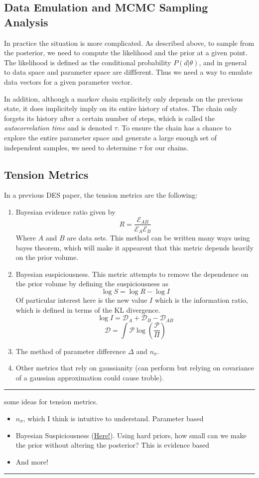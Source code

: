\subsection{Data Emulation and MCMC Sampling Analysis}

In practice the situation is more complicated. As described above, to sample from the posterior, we need to compute the likelihood and the prior at a given point. The likelihood is defined as the conditional probability $P(d|\theta)$, and in general to data space and parameter space are diffferent.
Thus we need a way to emulate data vectors for a given parameter vector.

In addition, although a markov chain explicitely only depends on the previous state, it does implicitely imply on its entire history of states. The chain only forgets its history after a certain number of steps, which is called the \textit{autocorrelation time} and is denoted $\tau$. To ensure the chain has a chance to explore the entire parameter space and generate a large enough set of independent samples, we need to determine $\tau$ for our chains.

\subsection{Tension Metrics}
In a previous DES paper, the tension metrics are the following:
\begin{enumerate}
    \item Bayesian evidence ratio given by
	\[ R = \frac{\mathcal{E}_{AB}}{\mathcal{E}_A\mathcal{E}_B} \]
	Where $A$ and $B$ are data sets. This method can be written many ways using bayes theorem, which will make it appearent that this metric depends heavily on the prior volume.
    \item Bayesian suspiciousness. This metric attempts to remove the dependence on the prior volume by defining the suspiciousness as 
	\[ \log S = \log R - \log I \]
	Of particular interest here is the new value $I$ which is the information ratio, which is defined in terms of the KL divergence.
	\[ \log I = \mathcal{D}_A + \mathcal{D}_B - \mathcal{D}_{AB} \]
	\[ \mathcal{D} = \int \mathcal{P} \log(\frac{\mathcal{P}}{\Pi}) \]
    \item The method of parameter difference $\Delta$ and $n_\sigma$.
    \item Other metrics that rely on gaussianity (can perform but relying on covariance of a gaussian approximation could cause troble).
\end{enumerate}
\hrule
some ideas for tension metrics.
\begin{itemize}
    \item $n_\sigma$, which I think is intuitive to understand. Parameter based
    \item Bayesian Suspiciousness (\href{https://academic.oup.com/mnras/article/496/4/4647/5863223}{Here!}). Using hard priors, how small can we make the prior without altering the posterior? This is evidence based
    \item And more!
\end{itemize}
\hrule

